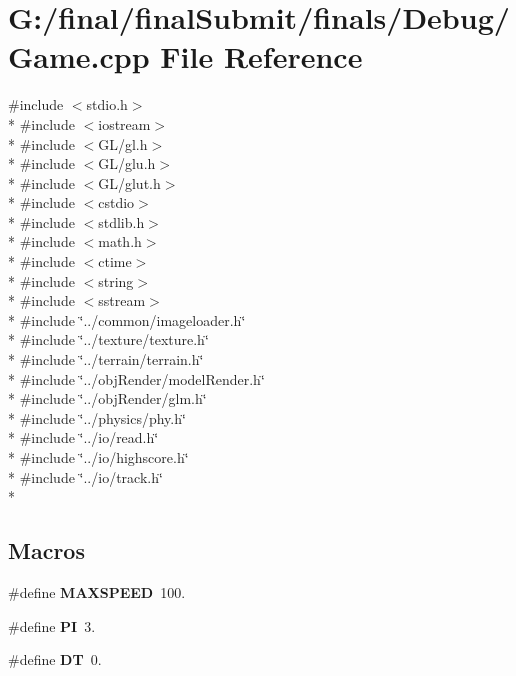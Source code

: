 \section{G\-:/final/final\-Submit/finals/\-Debug/\-Game.cpp File Reference}
\label{_game_8cpp}
{\ttfamily \#include $<$stdio.\-h$>$}\\*
{\ttfamily \#include $<$iostream$>$}\\*
{\ttfamily \#include $<$G\-L/gl.\-h$>$}\\*
{\ttfamily \#include $<$G\-L/glu.\-h$>$}\\*
{\ttfamily \#include $<$G\-L/glut.\-h$>$}\\*
{\ttfamily \#include $<$cstdio$>$}\\*
{\ttfamily \#include $<$stdlib.\-h$>$}\\*
{\ttfamily \#include $<$math.\-h$>$}\\*
{\ttfamily \#include $<$ctime$>$}\\*
{\ttfamily \#include $<$string$>$}\\*
{\ttfamily \#include $<$sstream$>$}\\*
{\ttfamily \#include \char`\"{}../common/imageloader.\-h\char`\"{}}\\*
{\ttfamily \#include \char`\"{}../texture/texture.\-h\char`\"{}}\\*
{\ttfamily \#include \char`\"{}../terrain/terrain.\-h\char`\"{}}\\*
{\ttfamily \#include \char`\"{}../obj\-Render/model\-Render.\-h\char`\"{}}\\*
{\ttfamily \#include \char`\"{}../obj\-Render/glm.\-h\char`\"{}}\\*
{\ttfamily \#include \char`\"{}../physics/phy.\-h\char`\"{}}\\*
{\ttfamily \#include \char`\"{}../io/read.\-h\char`\"{}}\\*
{\ttfamily \#include \char`\"{}../io/highscore.\-h\char`\"{}}\\*
{\ttfamily \#include \char`\"{}../io/track.\-h\char`\"{}}\\*
\subsection*{Macros}
\begin{DoxyCompactItemize}
\item 
\#define {\bf M\-A\-X\-S\-P\-E\-E\-D}~100.
\item 
\#define {\bf P\-I}~3.
\item 
\#define {\bf D\-T}~0.
\end{DoxyCompactItemize}
